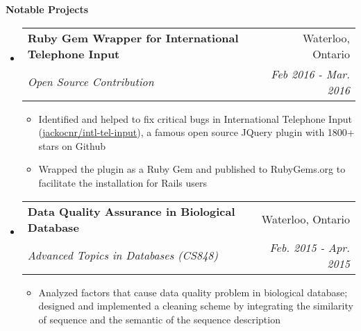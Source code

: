 \documentclass[letterpaper,10pt]{article}
\makeatletter
\newcommand{\resitem}[1]{\item #1 \vspace{-2pt}}
\newcommand{\resheading}[1]{{\large \colorbox{mygrey}{\begin{minipage}{\textwidth}{\textbf{#1 \vphantom{p\^{E}}}}\end{minipage}}}}
\newcommand{\ressubheading}[4]{
\begin{tabular*}{7.0in}{l@{\extracolsep{\fill}}r}
		\textbf{#1} & #2 \\
		\textit{#3} & \textit{#4} \\
\end{tabular*}\vspace{-6pt}}
\makeatother
\begin{document}
\resheading{Notable Projects}
\begin{itemize}
\itemsep0em
\item
    \ressubheading{Ruby Gem Wrapper for International Telephone Input}{Waterloo, Ontario}{Open Source Contribution}{Feb 2016 - Mar. 2016}
	\begin{itemize}
            \resitem{Identified and helped to fix critical bugs in International Telephone Input (\href{https://github.com/jackocnr/intl-tel-input}{\underline{jackocnr/intl-tel-input}}), a famous open source JQuery plugin with 1800+ stars on Github}
		\resitem{Wrapped the plugin as a Ruby Gem and published to RubyGems.org to facilitate the installation for Rails users}
	\end{itemize}
\item
	\ressubheading{Data Quality Assurance in Biological Database}{Waterloo, Ontario}{ Advanced Topics in Databases (CS848)}{ Feb. 2015 - Apr. 2015}
	\begin{itemize}
		\resitem{Analyzed factors that cause data quality problem in biological database; designed and implemented a cleaning scheme by integrating the similarity of sequence and the semantic of the sequence description}
	\end{itemize}
	
\end{itemize}
\end{document}
